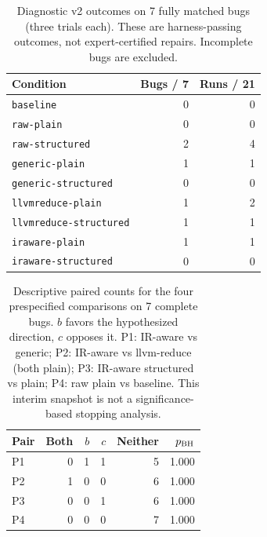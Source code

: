 \begin{table}[t]
\centering\scriptsize
\caption{Diagnostic v2 outcomes on 7 fully matched bugs (three trials each). These are harness-passing outcomes, not expert-certified repairs. Incomplete bugs are excluded.}
\label{tab:v2-matched}
\begin{tabular}{@{}lrr@{}}\toprule
Condition & Bugs / 7 & Runs / 21 \\ \midrule
\texttt{baseline} & 0 & 0 \\
\texttt{raw-plain} & 0 & 0 \\
\texttt{raw-structured} & 2 & 4 \\
\texttt{generic-plain} & 1 & 1 \\
\texttt{generic-structured} & 0 & 0 \\
\texttt{llvmreduce-plain} & 1 & 2 \\
\texttt{llvmreduce-structured} & 1 & 1 \\
\texttt{iraware-plain} & 1 & 1 \\
\texttt{iraware-structured} & 0 & 0 \\
\bottomrule\end{tabular}
\end{table}
\begin{table}[t]
\centering\scriptsize
\caption{Descriptive paired counts for the four prespecified comparisons on 7 complete bugs. $b$ favors the hypothesized direction, $c$ opposes it. P1: IR-aware vs generic; P2: IR-aware vs llvm-reduce (both plain); P3: IR-aware structured vs plain; P4: raw plain vs baseline. This interim snapshot is not a significance-based stopping analysis.}
\label{tab:v2-pairs}
\begin{tabular}{@{}lrrrrr@{}}\toprule
Pair & Both & $b$ & $c$ & Neither & $p_{\rm BH}$ \\ \midrule
P1 & 0 & 1 & 1 & 5 & 1.000 \\
P2 & 1 & 0 & 0 & 6 & 1.000 \\
P3 & 0 & 0 & 1 & 6 & 1.000 \\
P4 & 0 & 0 & 0 & 7 & 1.000 \\
\bottomrule\end{tabular}
\end{table}
